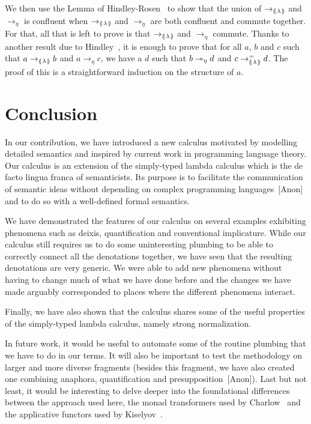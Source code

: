 \documentclass{llncs}
\begin{document}
We then use the Lemma of Hindley-Rosen~\cite{klop1992term} to show that the
union of $\to_{\llparenthesis \, \lambda \, \rrparenthesis}$ and $\to_\eta$ is confluent when
$\to_{\llparenthesis \, \lambda \, \rrparenthesis}$ and $\to_\eta$ are both confluent and commute
together. For that, all that is left to prove is that
$\to_{\llparenthesis \, \lambda \, \rrparenthesis}$ and $\to_\eta$ commute. Thanks to another result
due to Hindley~\cite{klop1992term}, it is enough to prove that for all $a$,
$b$ and $c$ such that $a \to_{\llparenthesis \, \lambda \, \rrparenthesis} b$ and $a \to_\eta c$, we
have a $d$ such that $b \twoheadrightarrow_\eta d$ and $c \to^=_{\llparenthesis \, \lambda \, \rrparenthesis}
d$. The proof of this is a straightforward induction on the structure of
$a$.


\section{Conclusion}
\label{sec:conclusion}

In our contribution, we have introduced a new calculus motivated by
modelling detailed semantics and inspired by current work in programming
language theory. Our calculus is an extension of the simply-typed lambda
calculus which is the de facto lingua franca of semanticists. Its purpose
is to facilitate the communication of semantic ideas without depending on
complex programming languages~[Anon]\cite{kiselyov2010lambda} and to do so
with a well-defined formal semantics.

We have demonstrated the features of our calculus on several examples
exhibiting phenomena such as deixis, quantification and conventional
implicature. While our calculus still requires us to do some uninteresting
plumbing to be able to correctly connect all the denotations together, we
have seen that the resulting denotations are very generic. We were able to
add new phenomena without having to change much of what we have done before
and the changes we have made arguably corresponded to places where the
different phenomena interact.

Finally, we have also shown that the calculus shares some of the useful
properties of the simply-typed lambda calculus, namely strong
normalization.

In future work, it would be useful to automate some of the routine plumbing
that we have to do in our terms. It will also be important to test the
methodology on larger and more diverse fragments (besides this fragment, we
have also created one combining anaphora, quantification and
presupposition~[Anon]). Last but not least, it would be interesting to
delve deeper into the foundational differences between the approach used
here, the monad transformers used by Charlow~\cite{charlow2014semantics}
and the applicative functors used by
Kiselyov~\cite{kiselyov2015applicative}.


%
%


\end{document}
